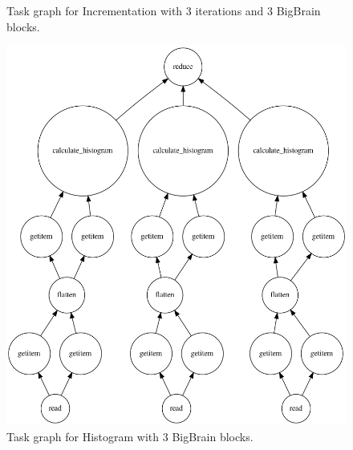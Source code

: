 \documentclass[AMA,STIX1COL]{WileyNJD-v2}
\begin{document}
\begin{figure}[h]
\begin{minipage}{0.4\textwidth}
		\caption{Task graph for Incrementation with 3 iterations and 3 BigBrain blocks.}
		\label{fig:graph-increment}		
	\end{minipage}
	\begin{minipage}{0.55\textwidth}
		\centering
		\includegraphics[width=\linewidth]{figures/histogram.png}
		\caption{Task graph for Histogram with 3 BigBrain blocks.}
		\label{fig:graph-histogram}			
	\end{minipage}
\end{figure}
											
\end{document}
